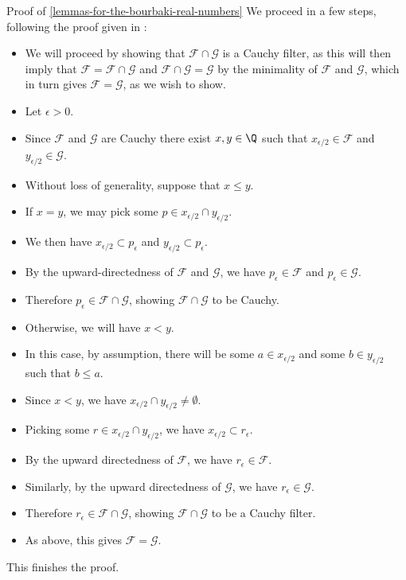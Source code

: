 \begin{Proof}{Proof of \cref{lemmas-for-the-bourbaki-real-numbers}}%
    We proceed in a few steps, following the proof given in \cite[Lemma 4.3]{weiss:the-reals-as-rational-cauchy-filters}:
    \begin{itemize}
        \item We will proceed by showing that $\mathcal{F}\cap\mathcal{G}$ is a Cauchy filter, as this will then imply that $\mathcal{F}=\mathcal{F}\cap\mathcal{G}$ and $\mathcal{F}\cap\mathcal{G}=\mathcal{G}$ by the minimality of $\mathcal{F}$ and $\mathcal{G}$, which in turn gives $\mathcal{F}=\mathcal{G}$, as we wish to show.
        \item Let $\epsilon\greater0$.
        \item Since $\mathcal{F}$ and $\mathcal{G}$ are Cauchy there exist $x,y\in\Q$ such that $x_{\epsilon/2}\in\mathcal{F}$ and $y_{\epsilon/2}\in\mathcal{G}$.
        \item Without loss of generality, suppose that $x\leq y$.
        \item If $x=y$, we may pick some $p\in x_{\epsilon/2}\cap y_{\epsilon/2}$.
        \item We then have $x_{\epsilon/2}\subset p_{\epsilon}$ and $y_{\epsilon/2}\subset p_{\epsilon}$.
        \item By the upward-directedness of $\mathcal{F}$ and $\mathcal{G}$, we have $p_{\epsilon}\in\mathcal{F}$ and $p_{\epsilon}\in\mathcal{G}$.
        \item Therefore $p_{\epsilon}\in\mathcal{F}\cap\mathcal{G}$, showing $\mathcal{F}\cap\mathcal{G}$ to be Cauchy.
        \item Otherwise, we will have $x\less y$.
        \item In this case, by assumption, there will be some $a\in x_{\epsilon/2}$ and some $b\in y_{\epsilon/2}$ such that $b\leq a$.
        \item Since $x\less y$, we have $x_{\epsilon/2}\cap y_{\epsilon/2}\neq\emptyset$.
        \item Picking some $r\in x_{\epsilon/2}\cap y_{\epsilon/2}$, we have $x_{\epsilon/2}\subset r_{\epsilon}$.
        \item By the upward directedness of $\mathcal{F}$, we have $r_{\epsilon}\in\mathcal{F}$.
        \item Similarly, by the upward directedness of $\mathcal{G}$, we have $r_{\epsilon}\in\mathcal{G}$.
        \item Therefore $r_{\epsilon}\in\mathcal{F}\cap\mathcal{G}$, showing $\mathcal{F}\cap\mathcal{G}$ to be a Cauchy filter.
        \item As above, this gives $\mathcal{F}=\mathcal{G}$.
    \end{itemize}
    This finishes the proof.


\end{Proof}
